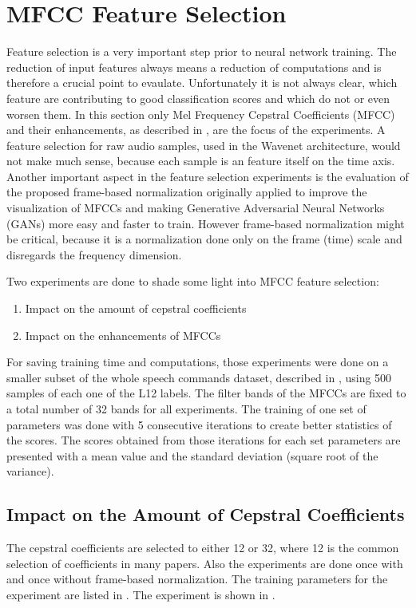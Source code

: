 
\section{MFCC Feature Selection}\label{sec:exp_fs}
\thesisStateNotReady
Feature selection is a very important step prior to neural network training.
The reduction of input features always means a reduction of computations and is therefore a crucial point to evaulate.
Unfortunately it is not always clear, which feature are contributing to good classification scores and which do not or even worsen them.
In this section only Mel Frequency Cepstral Coefficients (MFCC) and their enhancements, as described in , are the focus of the experiments.
A feature selection for raw audio samples, used in the Wavenet architecture, would not make much sense, because each sample is an feature itself on the time axis.
Another important aspect in the feature selection experiments is the evaluation of the proposed frame-based normalization  originally applied to improve the visualization of MFCCs and making Generative Adversarial Neural Networks (GANs) more easy and faster to train.
However frame-based normalization might be critical, because it is a normalization done only on the frame (time) scale and disregards the frequency dimension.

Two experiments are done to shade some light into MFCC feature selection:
\begin{enumerate}
    \item Impact on the amount of cepstral coefficients
    \item Impact on the enhancements of MFCCs
\end{enumerate}
For saving training time and computations, those experiments were done on a smaller subset of the whole speech commands dataset, described in , using 500 samples of each one of the L12 labels.
The filter bands of the MFCCs are fixed to a total number of 32 bands for all experiments.
The training of one set of parameters was done with 5 consecutive iterations to create better statistics of the scores.
The scores obtained from those iterations for each set parameters are presented with a mean value and the standard deviation (square root of the variance).



\subsection{Impact on the Amount of Cepstral Coefficients}
The cepstral coefficients are selected to either 12 or 32, where 12 is the common selection of coefficients in many papers.
Also the experiments are done once with and once without frame-based normalization.
The training parameters for the experiment are listed in .
The experiment is shown in .

%


